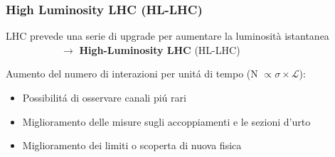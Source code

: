 \documentclass{beamer}
\begin{document}
\begin{frame}
\frametitle{High Luminosity LHC (HL-LHC)}
 {
LHC prevede una serie di upgrade per aumentare la luminosit\`a istantanea \\
\ \ \ \ \ \ \ \ \ \ \  $\rightarrow$ \textbf{High-Luminosity LHC} (HL-LHC)

Aumento del numero di interazioni per unit\'a di tempo (N $\propto \sigma \times \mathcal{L}$):\\
\begin{itemize}
\item Possibilit\'a di osservare canali pi\'u rari
\item Miglioramento delle misure sugli accoppiamenti e le sezioni d'urto
\item Miglioramento dei limiti o scoperta di nuova fisica
\end{itemize}}


\end{frame}
\end{document}
